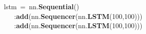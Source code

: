 \noindent
\mbox{}lstm\ =\ nn.\textbf{Sequential}() \\
\mbox{}\ \ \ :\textbf{add}(nn.\textbf{Sequencer}(nn.\textbf{LSTM}(100,100))) \\
\mbox{}\ \ \ :\textbf{add}(nn.\textbf{Sequencer}(nn.\textbf{LSTM}(100,100)))
